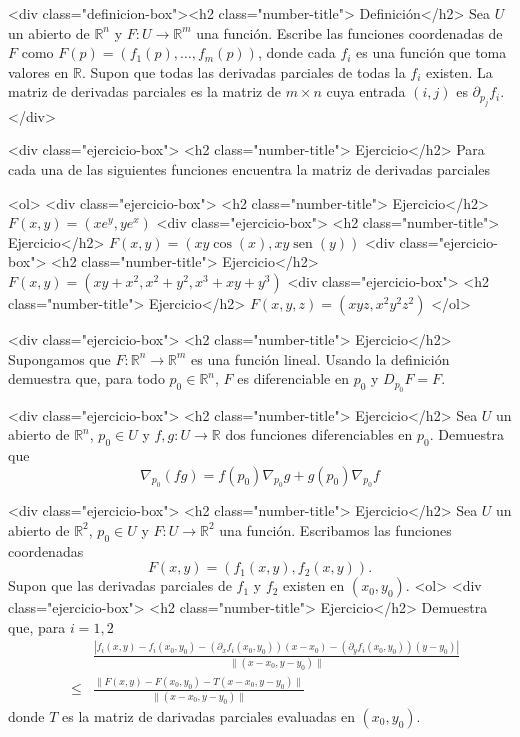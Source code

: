 \documentclass{article}
\theoremstyle{definition}
\newcommand{\sen}{\operatorname{sen}}
\begin{document}
        

                <div class="definicion-box"><h2 class="number-title">  Definición</h2>
          Sea $U$ un abierto de $\mathbb{R}^n$ y $F:U \to \mathbb{R}^m$ una función.
          Escribe las funciones coordenadas de $F$ como $F(p)=(f_1(p), \dots, f_m(p))$,
          donde cada $f_i$ es una función que toma valores en $\mathbb{R}$. Supon que
          todas las derivadas parciales de todas la $f_i$ existen. La matriz de derivadas
          parciales es la matriz de $m\times n$ cuya entrada $(i,j)$ es $\partial_{p_j}f_i$.
        </div>

      <div class="ejercicio-box"> <h2 class="number-title"> Ejercicio</h2> Para cada una de las siguientes funciones encuentra la matriz de derivadas
        parciales

        <ol>
        <div class="ejercicio-box"> <h2 class="number-title"> Ejercicio</h2> $F(x,y)=(xe^y, ye^x)$
        <div class="ejercicio-box"> <h2 class="number-title"> Ejercicio</h2> $F(x,y)=(xy\cos(x), xy\sen(y))$
        <div class="ejercicio-box"> <h2 class="number-title"> Ejercicio</h2> $F(x,y)=(xy+x^2,x^2+y^2, x^3+xy+y^3)$
        <div class="ejercicio-box"> <h2 class="number-title"> Ejercicio</h2> $F(x,y,z)=(xyz, x^2y^2z^2)$
        </ol>


        
      <div class="ejercicio-box"> <h2 class="number-title"> Ejercicio</h2> Supongamos que  $F:\mathbb{R}^n \to \mathbb{R}^m$ es una función lineal.
        Usando la definición demuestra que, para todo $p_0\in \mathbb{R}^n$, $F$ es
        diferenciable en $p_0$ y $D_{p_0}F=F$.


      <div class="ejercicio-box"> <h2 class="number-title"> Ejercicio</h2> Sea $U$ un abierto de $\mathbb{R}^n$, $p_0\in U$  y $f,g:U \to \mathbb{R}$ dos funciones diferenciables en 
         $p_0$. Demuestra que
        $$
        \nabla_{p_0}(fg)=f(p_0)\nabla_{p_0}g + g(p_0)\nabla_{p_0}f  
        $$




          <div class="ejercicio-box"> <h2 class="number-title"> Ejercicio</h2> Sea $U$ un abierto de $\mathbb{R}^2$, $p_0\in U$
            y $F:U \to \mathbb{R}^2$ una función. Escribamos
            las funciones coordenadas
            $$
            F(x,y)=(f_1(x,y), f_2(x,y)).
            $$
            Supon que las derivadas parciales de  $f_1$ y
            $f_2$ existen en $(x_0,y_0)$.
            <ol>
            <div class="ejercicio-box"> <h2 class="number-title"> Ejercicio</h2> Demuestra que, para $i=1,2$
              \begin{eqnarray*}
                & & \frac{|f_i(x,y)-f_i(x_0,y_0)-(\partial_xf_i(x_0,y_0))(x-x_0)-
                (\partial_yf_i(x_0,y_0))(y-y_0)|}{\|(x-x_0,y-y_0)\|} \\
              &\leq &
              \frac{\|F(x,y)-F(x_0,y_0)-T(x-x_0,y-y_0) \|}{\|(x-x_0,y-y_0)\|}
              \end{eqnarray*}
            donde $T$ es la matriz de darivadas parciales evaluadas
            en $(x_0,y_0)$.
\end{document}
